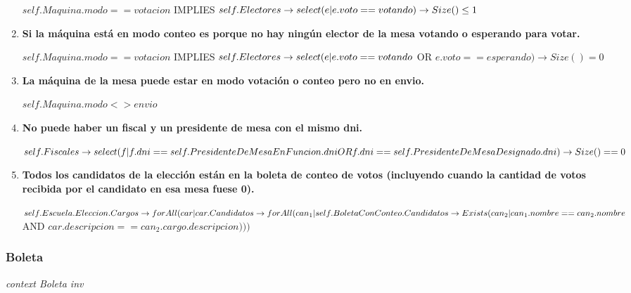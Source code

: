 \begin{enumerate}
$self.Maquina.modo == votacion$  IMPLIES  $ \\
self.Electores \rightarrow select(e | e.voto == votando) \rightarrow Size() \leq 1$

\item \textbf{Si la máquina está en modo conteo es porque no hay ningún elector de la mesa votando o esperando para votar.}

$self.Maquina.modo == votacion$  IMPLIES  $ \\
self.Electores \rightarrow \\
select(e | e.voto == votando$ OR $e.voto == esperando) \rightarrow Size() = 0$

\item \textbf{La máquina de la mesa puede estar en modo votación o conteo pero no en envio.}

$self.Maquina.modo <> envio$

\item \textbf{No puede haber un fiscal y un presidente de mesa con el mismo dni.}

$self.Fiscales \rightarrow \\
select(f | f.dni == self.PresidenteDeMesaEnFuncion.dni OR \\
f.dni == self.PresidenteDeMesaDesignado.dni) \rightarrow \\
Size() == 0 $

\item \textbf{Todos los candidatos de la elecci\'on est\'an en la boleta de conteo de votos (incluyendo cuando la cantidad de votos recibida por el candidato en esa mesa fuese 0).}

$self.Escuela.Eleccion.Cargos \rightarrow \\
forAll(car | car.Candidatos \rightarrow \\
forAll(can_1 | self.BoletaConConteo.Candidatos \rightarrow \\
Exists(can_2| can_1.nombre == can_2.nombre $ AND $car.descripcion==can_2.cargo.descripcion)))$

\end{enumerate}

\subsubsection*{Boleta}

\textit{context Boleta
inv}

